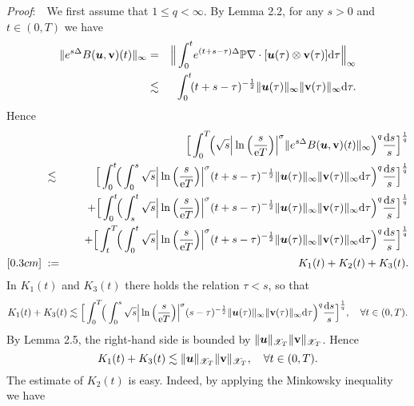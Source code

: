 \documentclass[11pt]{article}
\newcommand{\rmd}{\mbox{\rm d}}
\newcommand{\bfu}{{\mbox{\boldmath $u$}}}
\newcommand{\rme}{{\rm e}}
\begin{document}
  {\em Proof}:\ \ We first assume that $1\leqslant q<\infty$. By Lemma 2.2, for any $s>0$ and $t\in (0,T)$ we have
\begin{eqnarray*}
  \|e^{s\Delta}B(\bfu,\mathbf{v})(t)\|_{\infty}
  &=&\Big\|\int_0^t\! e^{(t+s-\tau)\Delta}\mathbb{P}\nabla\cdot[\bfu(\tau)\otimes\mathbf{v}(\tau)]\rmd\tau\Big\|_{\infty}
\\
  &\lesssim &\int_0^{t}\!(t+s-\tau)^{-\frac{1}{2}}\|\bfu(\tau)\|_{\infty}\|\mathbf{v}(\tau)\|_{\infty}\rmd\tau.
\end{eqnarray*}
  Hence
\begin{eqnarray*}
  && \Big[\int_0^T\!\!\Big(\sqrt{s}\Big|\ln\Big(\frac{s}{\rme T}\Big)\Big|^{\sigma}\|e^{s\Delta}B(\bfu,\mathbf{v})(t)\|_{\infty}
  \Big)^q\frac{\rmd s}{s}\Big]^{\frac{1}{q}}
\nonumber\\
  &\;\lesssim\; &\Big[\int_0^t\!\!\Big(\int_0^s\sqrt{s}\Big|\ln\Big(\frac{s}{\rme T}\Big)\Big|^{\sigma}(t+s-\tau)^{-\frac{1}{2}}
  \|\bfu(\tau)\|_{\infty}\|\mathbf{v}(\tau)\|_{\infty}\rmd\tau\Big)^q\frac{\rmd s}{s}\Big]^{\frac{1}{q}}
\nonumber\\
  && \quad +\Big[\int_0^t\!\!\Big(\int_s^t\sqrt{s}\Big|\ln\Big(\frac{s}{\rme T}\Big)\Big|^{\sigma}(t+s-\tau)^{-\frac{1}{2}}
  \|\bfu(\tau)\|_{\infty}\|\mathbf{v}(\tau)\|_{\infty}\rmd\tau\Big)^q\frac{\rmd s}{s}\Big]^{\frac{1}{q}}
\nonumber\\
  && \quad +\Big[\int_t^T\!\!\Big(\int_0^t\sqrt{s}\Big|\ln\Big(\frac{s}{\rme T}\Big)\Big|^{\sigma}(t+s-\tau)^{-\frac{1}{2}}
  \|\bfu(\tau)\|_{\infty}\|\mathbf{v}(\tau)\|_{\infty}\rmd\tau\Big)^q\frac{\rmd s}{s}\Big]^{\frac{1}{q}}
\nonumber\\ [0.3cm]
  &\;:=\; & K_1(t)+ K_2(t)+ K_3(t).
\end{eqnarray*}
  In $K_1(t)$ and $K_3(t)$ there holds the relation $\tau<s$, so that
$$
  K_1(t)+K_3(t)\lesssim\Big[\int_0^T\!\!\Big(\int_0^s\sqrt{s}\Big|\ln\Big(\frac{s}{\rme T}\Big)\Big|^{\sigma}(s-\tau)^{-\frac{1}{2}}
  \|\bfu(\tau)\|_{\infty}\|\mathbf{v}(\tau)\|_{\infty}\rmd\tau\Big)^q\frac{\rmd s}{s}\Big]^{\frac{1}{q}}, \quad \forall t\in (0,T).
$$
  By Lemma 2.5, the right-hand side is bounded by $\|\bfu\|_{\mathscr{X}_T}\|\mathbf{v}\|_{\mathscr{X}_T}$. Hence
\begin{equation}
  K_1(t)+K_3(t)\lesssim\|\bfu\|_{\mathscr{X}_T}\|\mathbf{v}\|_{\mathscr{X}_T}, \quad \forall t\in (0,T).
\end{equation}
  The estimate of $K_2(t)$ is easy. Indeed, by applying the Minkowsky inequality we have
\end{document}
